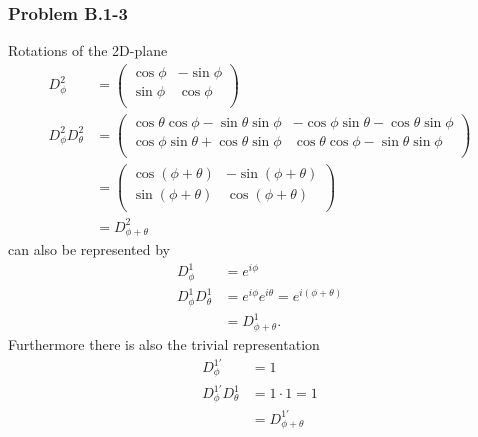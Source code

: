 \documentclass[10pt,a4paper]{book}
\theoremstyle{definition}
\begin{document}
\subsubsection{Problem B.1-3}
Rotations of the 2D-plane
\begin{align}
D^2_\phi&=\left(
\begin{array}{cc}
\cos\phi& -\sin\phi  \\
\sin\phi & \cos\phi  \\
\end{array}
\right)\\
D^2_\phi D^2_\theta&= \left(
\begin{array}{cc}
 \cos\theta \cos\phi-\sin\theta \sin\phi  & -\cos\phi \sin\theta-\cos\theta\sin\phi \\
 \cos\phi\sin\theta+\cos\theta \sin\phi & \cos\theta \cos\phi
   -\sin\theta \sin\phi \\
\end{array}
\right)\\
&=\left(
\begin{array}{cc}
\cos(\phi+\theta)& -\sin(\phi+\theta)  \\
\sin(\phi+\theta) & \cos(\phi+\theta)  \\
\end{array}
\right)\\
&=D^2_{\phi+\theta}
\end{align}
can also be represented by
\begin{align}
D^1_\phi&=e^{i\phi}\\
D^1_\phi D^1_\theta&=e^{i\phi}e^{i\theta}=e^{i(\phi+\theta)}\\
&=D^1_{\phi+\theta}.
\end{align}
Furthermore there is also the trivial representation
\begin{align}
D^{1'}_\phi&=1\\
D^{1'}_\phi D^1_\theta&=1\cdot1=1\\
&=D^{1'}_{\phi+\theta}
\end{align}
\end{document}

